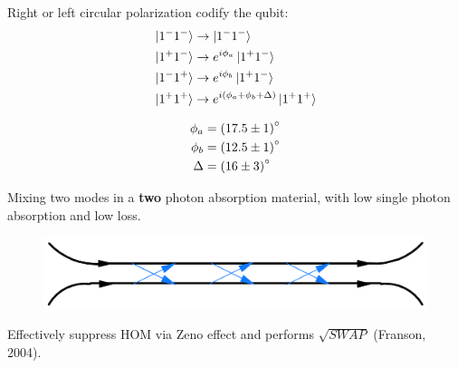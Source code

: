 \documentclass{beamer}
\begin{document}
\begin{frame}
\begin{center}
Right or left circular polarization codify the qubit:
\begin{align*}
& \ket{1^{-} 1^{-}} \rightarrow \ket{1^{-} 1^{-}} \\
& \ket{1^{+} 1^{-}} \rightarrow e^{i \phi_a} \ket{1^{+} 1^{-}} \\
& \ket{1^{-} 1^{+}} \rightarrow e^{i \phi_b} \ket{1^{+} 1^{-}} \\
& \ket{1^{+} 1^{+}} \rightarrow e^{i \left( \phi_a +\phi_b + \Delta \right)} \ket{1^{+} 1^{+}}
\end{align*}

\begin{align*}
\phi_{a} &= \left( 17.5 \pm 1 \right) \degree\\
\phi_{b} &= \left( 12.5 \pm 1 \right) \degree\\
\Delta &= \left( 16 \pm 3 \right) \degree
\end{align*}

\end{center}
\end{frame}

\begin{frame}
\begin{center}

Mixing two modes in a \textbf{two} photon absorption material, with low single photon absorption and low loss.

\begin{figure}[!htb]
\centering
\includegraphics[scale=.20]{immagini/zeno.png}
\end{figure}

Effectively suppress HOM via Zeno effect and performs $\sqrt{SWAP}$ (Franson, 2004).\\


\end{center}
\end{frame}
\end{document}

